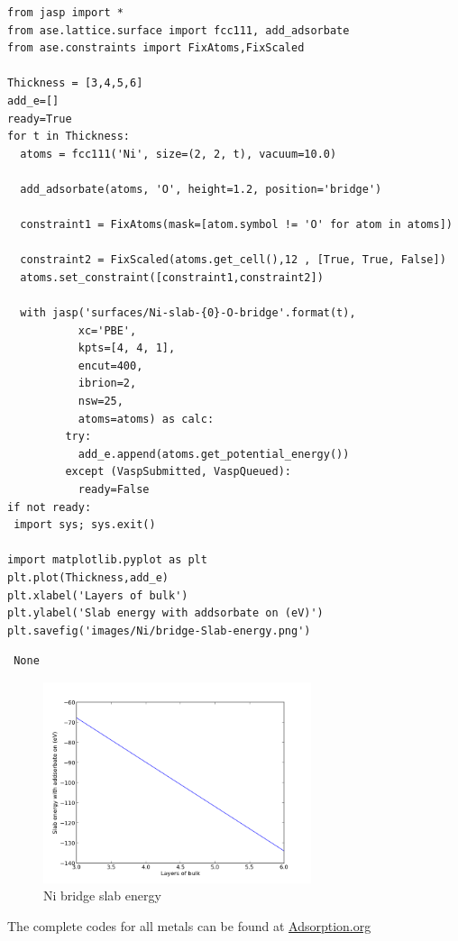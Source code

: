 \documentclass[11pt]{article}
\begin{document}
\begin{verbatim}
from jasp import *
from ase.lattice.surface import fcc111, add_adsorbate
from ase.constraints import FixAtoms,FixScaled

Thickness = [3,4,5,6]
add_e=[]
ready=True
for t in Thickness:
  atoms = fcc111('Ni', size=(2, 2, t), vacuum=10.0)

  add_adsorbate(atoms, 'O', height=1.2, position='bridge')

  constraint1 = FixAtoms(mask=[atom.symbol != 'O' for atom in atoms])

  constraint2 = FixScaled(atoms.get_cell(),12 , [True, True, False])
  atoms.set_constraint([constraint1,constraint2])

  with jasp('surfaces/Ni-slab-{0}-O-bridge'.format(t),
           xc='PBE',
           kpts=[4, 4, 1],
           encut=400,
           ibrion=2,
           nsw=25,
           atoms=atoms) as calc:
         try:
           add_e.append(atoms.get_potential_energy())
         except (VaspSubmitted, VaspQueued):
           ready=False
if not ready:
 import sys; sys.exit()

import matplotlib.pyplot as plt
plt.plot(Thickness,add_e)
plt.xlabel('Layers of bulk')
plt.ylabel('Slab energy with addsorbate on (eV)')
plt.savefig('images/Ni/bridge-Slab-energy.png')
\end{verbatim}
\begin{verbatim}
 None
\end{verbatim}
\begin{figure}[H]
\centering
\includegraphics[width=0.7\textwidth]{./images/Ni/bridge-Slab-energy.png}
\caption{Ni bridge slab energy}
\end{figure}

The complete codes for all metals can be found at \href{https://github.com/yichuns/FinalProject/blob/master/Adsorption.org}{Adsorption.org}
\end{document}
